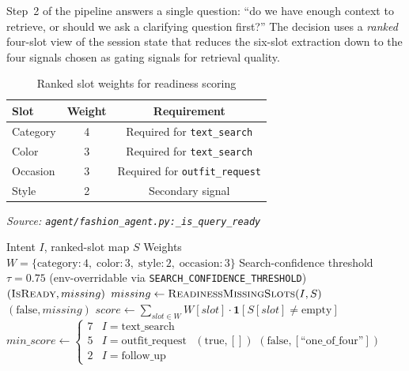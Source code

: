 Step~2 of the pipeline answers a single question: ``do we have enough context to retrieve, or should we ask a clarifying question first?'' The decision uses a \emph{ranked} four-slot view of the session state that reduces the six-slot extraction down to the four signals chosen as gating signals for retrieval quality.

\begin{table}[H]
\centering
\begin{tabular}{lcc}
\toprule
\textbf{Slot} & \textbf{Weight} & \textbf{Requirement}\\
\midrule
Category & 4 & Required for \texttt{text\_search}\\
Color    & 3 & Required for \texttt{text\_search}\\
Occasion & 3 & Required for \texttt{outfit\_request}\\
Style    & 2 & Secondary signal\\
\bottomrule
\end{tabular}
\caption{Ranked slot weights for readiness scoring}
\label{tab:slot_weights}
\end{table}

\begin{algorithm}[H]
\caption{Slot Readiness Evaluation}\label{alg:slot_readiness}
\textit{Source: \texttt{agent/fashion\_agent.py:\_is\_query\_ready}}
\begin{algorithmic}[1]
\Require Intent $I$, ranked-slot map $S$
\Require Weights $W=\{\text{category}{:}4,\;\text{color}{:}3,\;\text{style}{:}2,\;\text{occasion}{:}3\}$
\Require Search-confidence threshold $\tau = 0.75$ (env-overridable via \texttt{SEARCH\_CONFIDENCE\_THRESHOLD})
\Ensure $(\textsc{IsReady}, missing)$
    \State $missing \gets \textsc{ReadinessMissingSlots}(I, S)$
    \State \Return $(\text{false}, missing)$\EndIf
    \State $score \gets \sum_{slot \in W} W[slot] \cdot \mathbf{1}[S[slot] \neq \text{empty}]$
    \State $min\_score \gets \begin{cases}7 & I = \text{text\_search}\\5 & I = \text{outfit\_request}\\2 & I = \text{follow\_up}\end{cases}$
    \State \Return $(\text{true}, [])$\EndIf
    \State \Return $(\text{false}, [\text{``one\_of\_four''}])$
\EndFunction
\end{algorithmic}
\end{algorithm}

